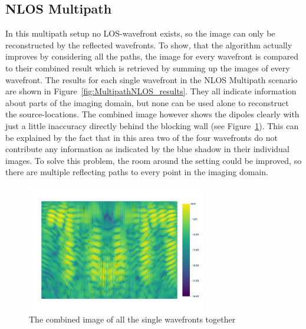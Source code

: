 \subsection{NLOS Multipath}
In this multipath setup no LOS-wavefront exists, so the image can only be reconstructed by the reflected wavefronts.
To show, that the algorithm actually improves by considering all the paths, the image for every wavefront is compared to their combined result which is retrieved by summing up the images of every wavefront.
The results for each single wavefront in the NLOS Multipath scenario are shown in Figure~\ref{fig:MultipathNLOS_results}.
They all indicate information about parts of the imaging domain, but none can be used alone to reconstruct the source-locations.
The combined image however shows the dipoles clearly with just a little inaccuracy directly behind the blocking wall (see Figure~\ref{fig:MultipathNLOS_combined}).
This can be explained by the fact that in this area two of the four wavefronts do not contribute any information as indicated by the blue shadow in their individual images.
To solve this problem, the room around the setting could be improved, so there are multiple reflecting paths to every point in the imaging domain.

\begin{figure}[ht]
    \centering
    \includegraphics[page=1, width=0.7\textwidth]{figures/multipath_nlos_combined.pdf}
    \caption{The combined image of all the single wavefronts together}\label{fig:MultipathNLOS_combined}
\end{figure}

